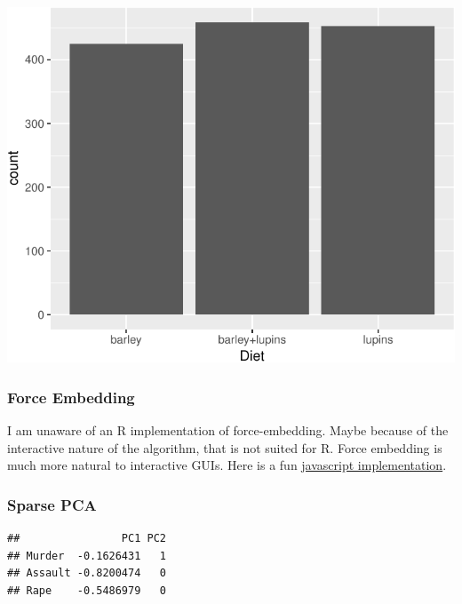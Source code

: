 \documentclass[]{book}
\newenvironment{Shaded}{\begin{snugshade}}{\end{snugshade}}
\newcommand{\KeywordTok}[1]{\textcolor[rgb]{0.13,0.29,0.53}{\textbf{#1}}}
\newcommand{\DataTypeTok}[1]{\textcolor[rgb]{0.13,0.29,0.53}{#1}}
\newcommand{\DecValTok}[1]{\textcolor[rgb]{0.00,0.00,0.81}{#1}}
\newcommand{\FloatTok}[1]{\textcolor[rgb]{0.00,0.00,0.81}{#1}}
\newcommand{\StringTok}[1]{\textcolor[rgb]{0.31,0.60,0.02}{#1}}
\newcommand{\CommentTok}[1]{\textcolor[rgb]{0.56,0.35,0.01}{\textit{#1}}}
\newcommand{\OtherTok}[1]{\textcolor[rgb]{0.56,0.35,0.01}{#1}}
\newcommand{\OperatorTok}[1]{\textcolor[rgb]{0.81,0.36,0.00}{\textbf{#1}}}
\newcommand{\NormalTok}[1]{#1}
\theoremstyle{definition}
\theoremstyle{definition}
\theoremstyle{definition}
\theoremstyle{remark}
\begin{document}
\includegraphics[width=0.5\linewidth]{Rcourse_files/figure-latex/unnamed-chunk-237-1}

\subsubsection{Force Embedding}\label{force-embedding}

I am unaware of an R implementation of force-embedding. Maybe because of
the interactive nature of the algorithm, that is not suited for R. Force
embedding is much more natural to interactive GUIs. Here is a fun
\href{http://bl.ocks.org/eesur/be2abfb3155a38be4de4}{javascript
implementation}.

\subsubsection{Sparse PCA}\label{sparse-pca}

\begin{Shaded}
\end{Shaded}

\begin{verbatim}
##                PC1 PC2
## Murder  -0.1626431   1
## Assault -0.8200474   0
## Rape    -0.5486979   0
\end{verbatim}
\end{document}
